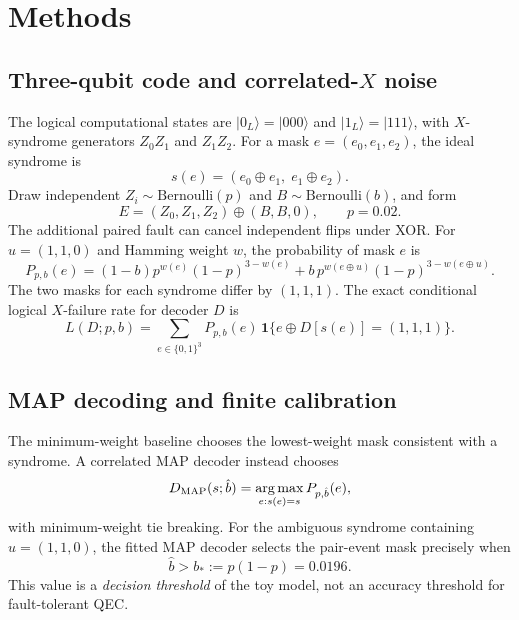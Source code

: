 \documentclass[11pt,a4paper]{article}
\begin{document}
\section{Methods}
\subsection{Three-qubit code and correlated-\texorpdfstring{$X$}{X} noise}
The logical computational states are $|0_L\rangle=|000\rangle$ and $|1_L\rangle=|111\rangle$, with $X$-syndrome generators $Z_0Z_1$ and $Z_1Z_2$. For a mask $e=(e_0,e_1,e_2)$, the ideal syndrome is
\begin{equation}
 s(e)=(e_0\oplus e_1,\;e_1\oplus e_2).
\end{equation}
Draw independent $Z_i\sim\mathrm{Bernoulli}(p)$ and $B\sim\mathrm{Bernoulli}(b)$, and form
\begin{equation}
 E=(Z_0,Z_1,Z_2)\oplus(B,B,0),\qquad p=0.02.
\end{equation}
The additional paired fault can cancel independent flips under XOR. For $u=(1,1,0)$ and Hamming weight $w$, the probability of mask $e$ is
\begin{equation}
 P_{p,b}(e)=(1-b)p^{w(e)}(1-p)^{3-w(e)}+b\,p^{w(e\oplus u)}(1-p)^{3-w(e\oplus u)}.
 \label{eq:noise}
\end{equation}
The two masks for each syndrome differ by $(1,1,1)$. The exact conditional logical $X$-failure rate for decoder $D$ is
\begin{equation}
 L(D;p,b)=\sum_{e\in\{0,1\}^3}P_{p,b}(e)\,\mathbf{1}\{e\oplus D[s(e)]=(1,1,1)\}.
 \label{eq:ler}
\end{equation}

\subsection{MAP decoding and finite calibration}
The minimum-weight baseline chooses the lowest-weight mask consistent with a syndrome. A correlated MAP decoder instead chooses
\begin{equation}
 D_{\rm MAP}(s;\hat b)=\mathop{\rm arg\,max}_{e:s(e)=s}P_{p,\hat b}(e),
\end{equation}
with minimum-weight tie breaking. For the ambiguous syndrome containing $u=(1,1,0)$, the fitted MAP decoder selects the pair-event mask precisely when
\begin{equation}
 \hat b>b_*:=p(1-p)=0.0196.
 \label{eq:threshold}
\end{equation}
This value is a \emph{decision threshold} of the toy model, not an accuracy threshold for fault-tolerant QEC.
\end{document}
